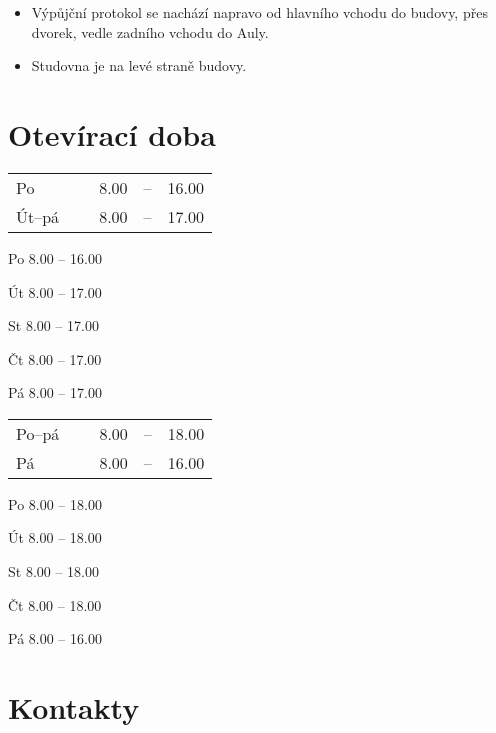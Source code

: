 


\begin{itemize}[leftmargin=0pt, topsep=0pt]
\item Výpůjční protokol se nachází napravo od hlavního vchodu
  do budovy, přes dvorek, vedle zadního vchodu do Auly.
\item Studovna  je na levé straně budovy.
\end{itemize}


\section{Otevírací doba}

\noindent{}

\ifdefined\HCode
\begin{tabular}{lllll}
  Po      & ~ & 8.00 &--& 16.00\\
  Út--pá  & ~ & 8.00 &--& 17.00
\end{tabular}

\else
Po 8.00 -- 16.00

Út 8.00 -- 17.00

St 8.00 -- 17.00

Čt 8.00 -- 17.00

Pá 8.00 -- 17.00
\fi

\noindent{}

\ifdefined\HCode
\begin{tabular}{lllll}
  Po--pá & ~ & 8.00 &--& 18.00\\
  Pá     & ~ & 8.00 &--& 16.00
\end{tabular}
\else
Po 8.00 -- 18.00

Út 8.00 -- 18.00

St 8.00 -- 18.00

Čt 8.00 -- 18.00

Pá 8.00 -- 16.00
\fi

\newpage
\section{Kontakty}

